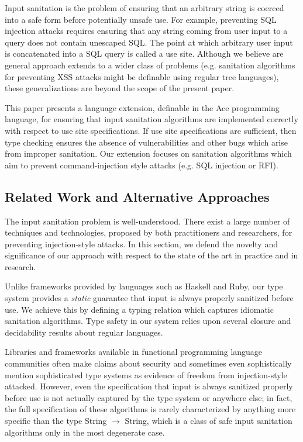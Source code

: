 \documentclass{acm_proc_article-sp}
\theoremstyle{definition}
\begin{document}
Input sanitation is the problem of ensuring that an arbitrary string
is coerced into a safe form before potentially unsafe use. For example, 
preventing SQL injection attacks requires ensuring that any string
coming from user input to a query does not contain unescaped SQL. 
The point at which arbitrary user input is concatenated into a SQL query is called a use site.
Although we believe are general approach extends to a wider class of problems
(e.g. sanitation algorithms for preventing XSS attacks might be definable using
regular tree languages), these generalizations are beyond the scope of the 
present paper.

This paper presents a language extension, definable in the Ace programming language,
for ensuring that input sanitation algorithms are implemented correctly with
respect to use site specifications. If use site specifications are sufficient, 
then type checking ensures the absence of vulnerabilities and other bugs which
arise from improper sanitation. Our extension focuses on sanitation algorithms 
which aim to prevent command-injection style attacks (e.g. SQL injection or RFI). 

\subsection{Related Work and Alternative Approaches}

The input sanitation problem is well-understood. There exist a large number
of techniques and technologies, proposed by both practitioners and researchers, for
preventing injection-style attacks. In this section, we defend the novelty and
significance of our approach with respect to the state of the art in practice 
and in research.

Unlike frameworks provided by languages such as Haskell and
Ruby, our type system provides a \emph{static} guarantee that input is always 
properly sanitized before use. We achieve this by defining a typing relation
which captures idiomatic sanitation algorithms. Type safety in our system relies upon 
several closure and decidability results about regular languages. 

Libraries and frameworks available in functional programming language communities often
make claims about security and sometimes even sophistically mention sophisticated
type systems as evidence of freedom from injection-style attacked.
However, even the specification that input is always sanitized properly before use is not
actually captured by the type system or anywhere else; in fact, the full specification of these
algorithms is rarely characterized by anything more specific than the type
String $\rightarrow$ String, which is a class of safe input sanitation algorithms
only in the most degenerate case.
\end{document}
